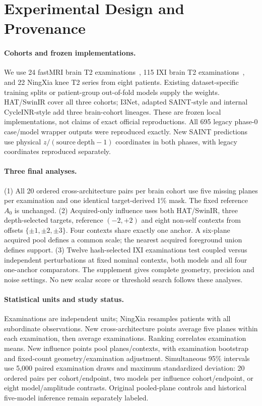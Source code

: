 \documentclass[10pt,twocolumn,letterpaper]{article}
\begin{document}
\section{Experimental Design and Provenance}
\paragraph{Cohorts and frozen implementations.}
We use 24 fastMRI brain T2 examinations~\cite{knoll2020fastmri}, 115 IXI brain T2 examinations~\cite{ixi_dataset}, and 22 NingXia knee T2 series from eight patients. Existing dataset-specific training splits or patient-group out-of-fold models supply the weights. HAT/SwinIR cover all three cohorts; I3Net, adapted SAINT-style and internal CycleINR-style add three brain-cohort lineages. These are frozen local implementations, not claims of exact official reproductions. All 695 legacy phase-0 case/model wrapper outputs were reproduced exactly. New SAINT predictions use physical $z/(\mathrm{source\ depth}-1)$ coordinates in both phases, with legacy coordinates reproduced separately.

\paragraph{Three final analyses.}
(1) All 20 ordered cross-architecture pairs per brain cohort use five missing planes per examination and one identical target-derived 1\% mask. The fixed reference $A_0$ is unchanged. (2) Acquired-only influence uses both HAT/SwinIR, three depth-selected targets, reference $(-2,+2)$ and eight non-self contexts from offsets $\{\pm1,\pm2,\pm3\}$. Four contexts share exactly one anchor. A six-plane acquired pool defines a common scale; the nearest acquired foreground union defines support. (3) Twelve hash-selected IXI examinations test coupled versus independent perturbations at fixed nominal contexts, both models and all four one-anchor comparators. The supplement gives complete geometry, precision and noise settings. No new scalar score or threshold search follows these analyses.

\paragraph{Statistical units and study status.}
Examinations are independent units; NingXia resamples patients with all subordinate observations. New cross-architecture points average five planes within each examination, then average examinations. Ranking correlates examination means. New influence points pool planes/contexts, with examination bootstrap and fixed-count geometry/examination adjustment. Simultaneous 95\% intervals use 5,000 paired examination draws and maximum standardized deviation: 20 ordered pairs per cohort/endpoint, two models per influence cohort/endpoint, or eight model/amplitude contrasts. Original pooled-plane controls and historical five-model inference remain separately labeled.
\end{document}

